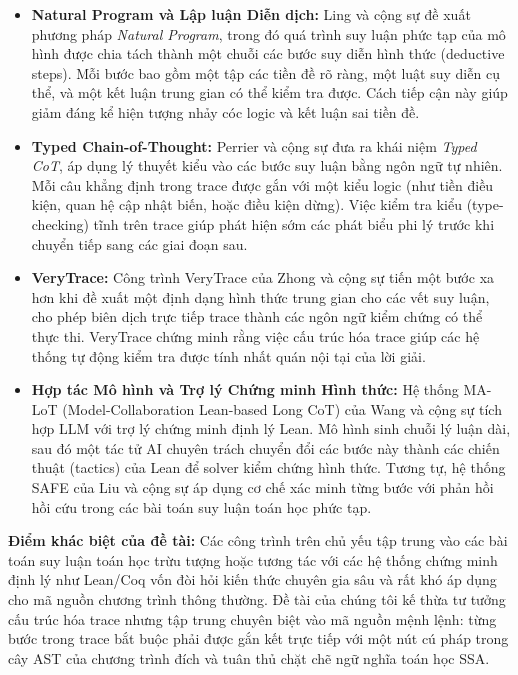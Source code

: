 \begin{itemize}
    \item \textbf{Natural Program và Lập luận Diễn dịch:} Ling và cộng sự \cite{ling2023deductive} đề xuất phương pháp \textit{Natural Program}, trong đó quá trình suy luận phức tạp của mô hình được chia tách thành một chuỗi các bước suy diễn hình thức (deductive steps). Mỗi bước bao gồm một tập các tiền đề rõ ràng, một luật suy diễn cụ thể, và một kết luận trung gian có thể kiểm tra được. Cách tiếp cận này giúp giảm đáng kể hiện tượng nhảy cóc logic và kết luận sai tiền đề.
    \item \textbf{Typed Chain-of-Thought:} Perrier và cộng sự \cite{perrier2025typed} đưa ra khái niệm \textit{Typed CoT}, áp dụng lý thuyết kiểu vào các bước suy luận bằng ngôn ngữ tự nhiên. Mỗi câu khẳng định trong trace được gắn với một kiểu logic (như tiền điều kiện, quan hệ cập nhật biến, hoặc điều kiện dừng). Việc kiểm tra kiểu (type-checking) tĩnh trên trace giúp phát hiện sớm các phát biểu phi lý trước khi chuyển tiếp sang các giai đoạn sau.
    \item \textbf{VeryTrace:} Công trình VeryTrace của Zhong và cộng sự \cite{zhong2026verytrace} tiến một bước xa hơn khi đề xuất một định dạng hình thức trung gian cho các vết suy luận, cho phép biên dịch trực tiếp trace thành các ngôn ngữ kiểm chứng có thể thực thi. VeryTrace chứng minh rằng việc cấu trúc hóa trace giúp các hệ thống tự động kiểm tra được tính nhất quán nội tại của lời giải.
    \item \textbf{Hợp tác Mô hình và Trợ lý Chứng minh Hình thức:} Hệ thống MA-LoT (Model-Collaboration Lean-based Long CoT) của Wang và cộng sự \cite{wang2025malot} tích hợp LLM với trợ lý chứng minh định lý Lean. Mô hình sinh chuỗi lý luận dài, sau đó một tác tử AI chuyên trách chuyển đổi các bước này thành các chiến thuật (tactics) của Lean để solver kiểm chứng hình thức. Tương tự, hệ thống SAFE của Liu và cộng sự \cite{liu2025safe} áp dụng cơ chế xác minh từng bước với phản hồi hồi cứu trong các bài toán suy luận toán học phức tạp.
\end{itemize}

\noindent\textbf{Điểm khác biệt của đề tài:} Các công trình trên chủ yếu tập trung vào các bài toán suy luận toán học trừu tượng hoặc tương tác với các hệ thống chứng minh định lý như Lean/Coq vốn đòi hỏi kiến thức chuyên gia sâu và rất khó áp dụng cho mã nguồn chương trình thông thường. Đề tài của chúng tôi kế thừa tư tưởng cấu trúc hóa trace nhưng tập trung chuyên biệt vào mã nguồn mệnh lệnh: từng bước trong trace bắt buộc phải được gắn kết trực tiếp với một nút cú pháp trong cây AST của chương trình đích và tuân thủ chặt chẽ ngữ nghĩa toán học SSA.

